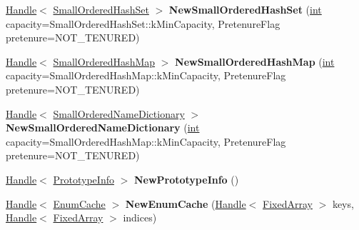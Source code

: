 \begin{DoxyCompactItemize}
\mbox{\hyperlink{classv8_1_1internal_1_1Handle}{Handle}}$<$ \mbox{\hyperlink{classv8_1_1internal_1_1SmallOrderedHashSet}{Small\+Ordered\+Hash\+Set}} $>$ {\bfseries New\+Small\+Ordered\+Hash\+Set} (\mbox{\hyperlink{classint}{int}} capacity=Small\+Ordered\+Hash\+Set\+::k\+Min\+Capacity, Pretenure\+Flag pretenure=N\+O\+T\+\_\+\+T\+E\+N\+U\+R\+ED)
\item 
\mbox{\label{classv8_1_1internal_1_1Factory_a4ccb48824b376af41612bec11c5a444f}} 
\mbox{\hyperlink{classv8_1_1internal_1_1Handle}{Handle}}$<$ \mbox{\hyperlink{classv8_1_1internal_1_1SmallOrderedHashMap}{Small\+Ordered\+Hash\+Map}} $>$ {\bfseries New\+Small\+Ordered\+Hash\+Map} (\mbox{\hyperlink{classint}{int}} capacity=Small\+Ordered\+Hash\+Map\+::k\+Min\+Capacity, Pretenure\+Flag pretenure=N\+O\+T\+\_\+\+T\+E\+N\+U\+R\+ED)
\item 
\mbox{\label{classv8_1_1internal_1_1Factory_af4e02cfd626e8b989e8090a6ee9a8a9f}} 
\mbox{\hyperlink{classv8_1_1internal_1_1Handle}{Handle}}$<$ \mbox{\hyperlink{classv8_1_1internal_1_1SmallOrderedNameDictionary}{Small\+Ordered\+Name\+Dictionary}} $>$ {\bfseries New\+Small\+Ordered\+Name\+Dictionary} (\mbox{\hyperlink{classint}{int}} capacity=Small\+Ordered\+Hash\+Map\+::k\+Min\+Capacity, Pretenure\+Flag pretenure=N\+O\+T\+\_\+\+T\+E\+N\+U\+R\+ED)
\item 
\mbox{\label{classv8_1_1internal_1_1Factory_a619671bbe685d91554c5efff01c602bb}} 
\mbox{\hyperlink{classv8_1_1internal_1_1Handle}{Handle}}$<$ \mbox{\hyperlink{classv8_1_1internal_1_1PrototypeInfo}{Prototype\+Info}} $>$ {\bfseries New\+Prototype\+Info} ()
\item 
\mbox{\label{classv8_1_1internal_1_1Factory_adfaee790a5bd0da785b4a242780ae3c5}} 
\mbox{\hyperlink{classv8_1_1internal_1_1Handle}{Handle}}$<$ \mbox{\hyperlink{classv8_1_1internal_1_1EnumCache}{Enum\+Cache}} $>$ {\bfseries New\+Enum\+Cache} (\mbox{\hyperlink{classv8_1_1internal_1_1Handle}{Handle}}$<$ \mbox{\hyperlink{classv8_1_1internal_1_1FixedArray}{Fixed\+Array}} $>$ keys, \mbox{\hyperlink{classv8_1_1internal_1_1Handle}{Handle}}$<$ \mbox{\hyperlink{classv8_1_1internal_1_1FixedArray}{Fixed\+Array}} $>$ indices)
\item 
\mbox{\label{classv8_1_1internal_1_1Factory_a2b2989b7044937aeffe986ffddb7ff95}} 

\end{DoxyCompactItemize}
